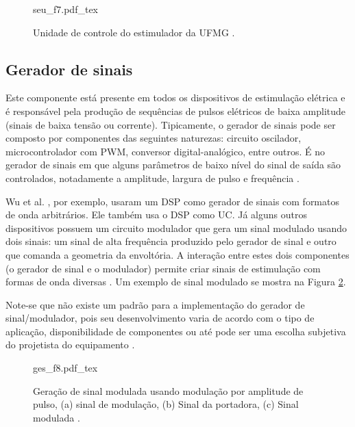 \begin{figure}
    \centering %
    \small %
    \def\svgwidth{0.4
    \columnwidth}%
    {seu_f7.pdf_tex}
    \caption{Unidade de controle do estimulador da \acrshort{UFMG}   \cite{Martins2008DeselvolvimentoArbitraria}.}
    \label{fig:seu_f7}
\end{figure}

\subsection{Gerador de sinais}
Este componente está presente em todos os dispositivos de estimulação elétrica e é responsável pela produção de sequências de pulsos elétricos de baixa amplitude (sinais de baixa tensão ou corrente). Tipicamente, o gerador de sinais pode ser composto por componentes das seguintes naturezas: circuito oscilador, microcontrolador com \acrshort{PWM}, conversor digital-analógico, entre outros.  É no gerador de sinais em que alguns parâmetros de baixo nível do sinal de saída são controlados, notadamente a amplitude, largura de pulso e frequência \cite{Cheng2004DevelopmentStimulation, Wu2002AApplications}.

Wu et al. \cite{Wu2002AApplications}, por exemplo, usaram um \acrshort{DSP} como gerador de sinais com formatos de onda arbitrários. Ele também usa o \acrshort{DSP} como \acrshort{UC}. Já alguns outros dispositivos possuem um circuito modulador que gera um sinal modulado usando dois sinais: um sinal de alta frequência produzido pelo gerador de sinal e outro que comanda a geometria da envoltória. A interação entre estes dois componentes (o gerador de sinal e o modulador) permite criar sinais de estimulação com formas de onda diversas \cite{Wu2002AApplications, Nogueira2017TheStimulator,KhosravaniSanaz2011DevelopingSystem}. Um exemplo de sinal modulado se mostra na Figura \ref{fig:ges_f8}.

Note-se que não existe um padrão para a implementação do gerador de sinal/modulador, pois seu desenvolvimento varia de acordo com o tipo de aplicação, disponibilidade de componentes ou até pode ser uma escolha subjetiva do projetista do equipamento \cite{Souza2017PowerSystems, Popovic2004CompexApplications}.

\vspace{0.3cm}
\begin{figure}
    \centering %
    \small %
    \def\svgwidth{0.42
    \columnwidth}%
    {ges_f8.pdf_tex}
    \caption{Geração de sinal modulada usando modulação por amplitude de pulso, (a) sinal de modulação, (b) Sinal da portadora, (c) Sinal modulada   \cite{Martins2008DeselvolvimentoArbitraria}.}
    \label{fig:ges_f8}
\end{figure}

